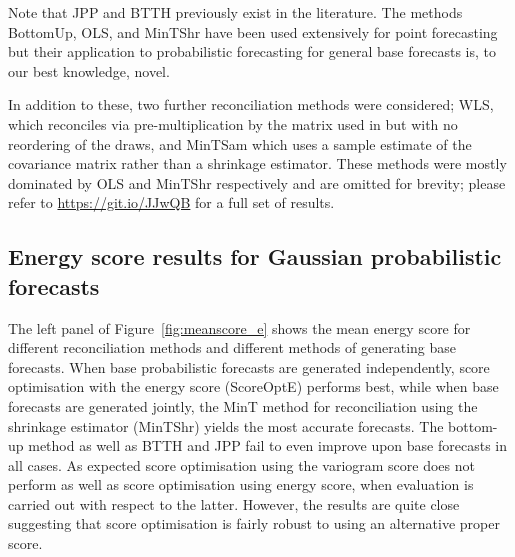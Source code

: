 \documentclass[a4paper,12pt]{article}
\theoremstyle{definition}
\begin{document}
Note that JPP and BTTH previously exist in the literature. The methods BottomUp, OLS, and MinTShr have been used extensively for point forecasting but their application to probabilistic forecasting for general base forecasts is, to our best knowledge, novel.

In addition to these, two further reconciliation methods were considered; WLS, which reconciles via pre-multiplication by the matrix used in \cite{JeoEtAl2019} but with no reordering of the draws, and MinTSam which uses a sample estimate of the covariance matrix rather than a shrinkage estimator. These methods were mostly dominated by OLS and MinTShr respectively and are omitted for brevity; please refer to \url{https://git.io/JJwQB} for a full set of results.

\subsection{Energy score results for Gaussian probabilistic forecasts}\label{sec:SimAnalysticalResults}

The left panel of Figure~\ref{fig:meanscore_e} shows the mean energy score for different reconciliation methods and different methods of generating base forecasts. When base probabilistic forecasts are generated independently, score optimisation with the energy score (ScoreOptE) performs best, while when base forecasts are generated jointly, the MinT method for reconciliation using the shrinkage estimator (MinTShr) yields the most accurate forecasts. The bottom-up method as well as BTTH and JPP fail to even improve upon base forecasts in all cases. As expected score optimisation using the variogram score does not perform as well as score optimisation using energy score, when evaluation is carried out with respect to the latter. However, the results are quite close suggesting that score optimisation is fairly robust to using an alternative proper score.
\end{document}
